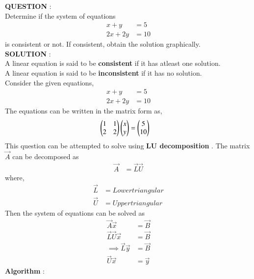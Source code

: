 \documentclass[journal]{IEEEtran}
\begin{document}
\textbf{QUESTION} : \\
Determine if the system of equations
\begin{align}
	x + y &= 5 \label{eq:qn} \\
	2x + 2y &= 10
\end{align}
is consistent or not. If consistent, obtain the solution graphically. \\
\textbf{SOLUTION} : \\
A linear equation is said to be \textbf{consistent} if it has atleast one solution. \\
A linear equation is said to be \textbf{inconsistent} if it has no solution. \\
Consider the given equations, 
\begin{align}
	x + y &= 5 \\
	2x + 2y &= 10
\end{align}
The equations can be written in the matrix form as, 
\begin{align}
	\begin{pmatrix}1 & 1 \\ 2 & 2\end{pmatrix} \begin{pmatrix}x \\ y\end{pmatrix} &= \begin{pmatrix}5 \\ 10 \end{pmatrix}
\end{align}
This question can be attempted to solve using \textbf{LU decomposition} . The matrix $\vec{A}$ can be decomposed as
\begin{align}
	\vec{A} &= \vec{L} \vec{U}
\end{align}
where, 
\begin{align}
	\vec{L} &= Lower triangular \\
	\vec{U} &= Upper triangular
\end{align}
Then the system of equations can be solved as
\begin{align}
	\vec{A} \vec{x} &= \vec{B} \label{eq:solve}\\
	\vec{L} \vec{U} \vec{x} &= \vec{B} \\
	\implies \vec{L} \vec{y} &= \vec{B} \label{eq:lu1} \\
	\vec{U} \vec{x} &= \vec{y} \label{eq:lu2}
\end{align}
\textbf{Algorithm} : \\
\end{document}
